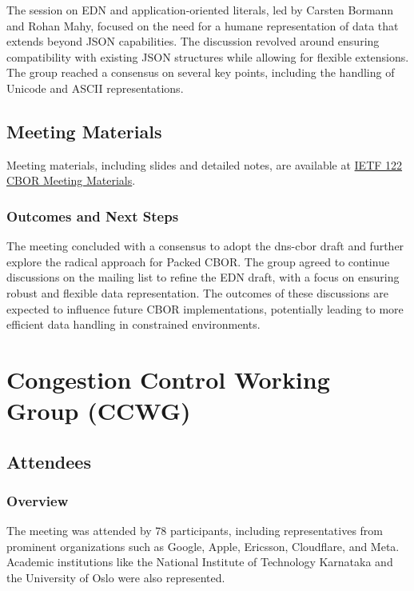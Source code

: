 \documentclass{article}
\begin{document}
The session on EDN and application-oriented literals, led by Carsten Bormann and Rohan Mahy, focused on the need for a humane representation of data that extends beyond JSON capabilities. The discussion revolved around ensuring compatibility with existing JSON structures while allowing for flexible extensions. The group reached a consensus on several key points, including the handling of Unicode and ASCII representations.

\subsection{Meeting Materials}

Meeting materials, including slides and detailed notes, are available at \href{https://datatracker.ietf.org/meeting/122/materials/slides-122-cbor}{IETF 122 CBOR Meeting Materials}.

\subsubsection{Outcomes and Next Steps}

The meeting concluded with a consensus to adopt the dns-cbor draft and further explore the radical approach for Packed CBOR. The group agreed to continue discussions on the mailing list to refine the EDN draft, with a focus on ensuring robust and flexible data representation. The outcomes of these discussions are expected to influence future CBOR implementations, potentially leading to more efficient data handling in constrained environments.



\newpage

\section{Congestion Control Working Group (CCWG)}

\subsection{Attendees}
\subsubsection{Overview}
The meeting was attended by 78 participants, including representatives from prominent organizations such as Google, Apple, Ericsson, Cloudflare, and Meta. Academic institutions like the National Institute of Technology Karnataka and the University of Oslo were also represented.
\end{document}
